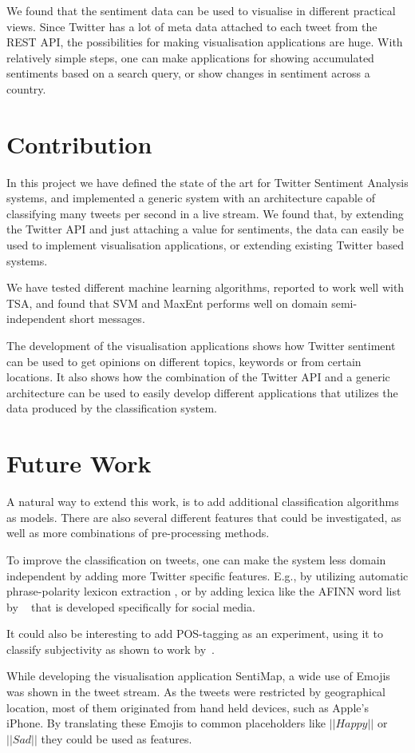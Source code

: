 We found that the sentiment data can be used to visualise in different practical views. Since Twitter has a lot of meta data attached to each tweet from the REST API, the possibilities for making visualisation applications are huge. With relatively simple steps, one can make applications for showing accumulated sentiments based on a search query, or show changes in sentiment across a country.

\section{Contribution}

In this project we have defined the state of the art for Twitter Sentiment Analysis systems, and implemented a generic system with an architecture capable of classifying many tweets per second in a live stream. We found that, by extending the Twitter API and just attaching a value for sentiments, the data can easily be used to implement visualisation applications, or extending existing Twitter based systems. 

We have tested different machine learning algorithms, reported to work well with TSA, and found that SVM and MaxEnt performs well on domain semi-independent short messages.

The development of the visualisation applications shows how Twitter sentiment can be used to get opinions on different topics, keywords or from certain locations. It also shows how the combination of the Twitter API and a generic architecture can be used to easily develop different applications that utilizes the data produced by the classification system.

\section{Future Work}

A natural way to extend this work, is to add additional classification algorithms as models. There are also several different features that could be investigated, as well as more combinations of pre-processing methods.

To improve the classification on tweets, one can make the system less domain independent by adding more Twitter specific features. E.g., by utilizing automatic phrase-polarity lexicon extraction \citep{VelikovichEA:10}, or by adding lexica like the AFINN word list by ~\cite{article:afinn} that is developed specifically for social media.


It could also be interesting to add POS-tagging as an experiment, using it to classify subjectivity as shown to work by~\cite{article:pak}.

While developing the visualisation application SentiMap, a wide use of Emojis was shown in the tweet stream. As the tweets were restricted by geographical location, most of them originated from hand held devices, such as Apple's iPhone. By translating these Emojis to common placeholders like $||Happy||$ or $||Sad||$ they could be used as features.